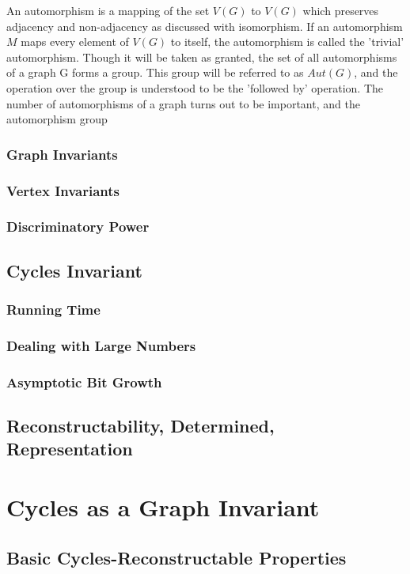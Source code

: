 \documentclass[11pt,a4paper]{report}
\begin{document}
An automorphism is a mapping of the set $V(G)$ to $V(G)$ which preserves adjacency and non-adjacency as discussed with isomorphism.
If an automorphism $M$ maps every element of $V(G)$ to itself, the automorphism is called the 'trivial' automorphism.
Though it will be taken as granted, the set of all automorphisms of a graph G forms a group.
This group will be referred to as $Aut(G)$, and the operation over the group is understood to be the 'followed by' operation.
The number of automorphisms of a graph turns out to be important, and the automorphism group

\subsection{Graph Invariants}
\subsection{Vertex Invariants}
\subsection{Discriminatory Power}

\section{Cycles Invariant}
\subsection{Running Time}
\subsection{Dealing with Large Numbers}
\subsection{Asymptotic Bit Growth}

\section{Reconstructability, Determined, Representation}



\chapter{Cycles as a Graph Invariant}

\section{Basic Cycles-Reconstructable Properties}
\end{document}
